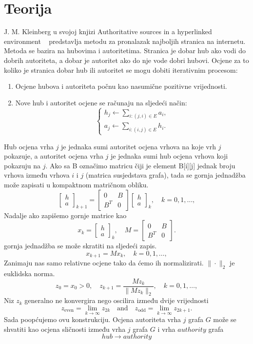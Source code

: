 \documentclass[12pt, letterpaper]{article}
\numberwithin{figure}{section}
\begin{document}
\section{Teorija}
 J. M. Kleinberg u svojoj knjizi Authoritative sources in a hyperlinked environment ~\cite{kleinberg1999} predstavlja metodu za pronalazak najboljih stranica na internetu. Metoda se bazira na hubovima i autoritetima. Stranica je dobar hub ako vodi do dobrih autoriteta, a dobar je autoritet ako do nje vode dobri hubovi. Ocjene za to koliko je stranica dobar hub ili autoritet se mogu dobiti iterativnim procesom:
 \begin{enumerate}
  \item Ocjene hubova i autoriteta počnu kao nasumične pozitivne vrijednosti.
  \item Nove hub i autoritet ocjene se računaju na sljedeći način:
  \[
\begin{cases}
h_j \leftarrow \sum_{i:(j,i)\in E} a_i, \\
a_j \leftarrow \sum_{i:(i,j)\in E} h_i.
\end{cases}
\]
\end{enumerate}
Hub ocjena vrha $j$ je jednaka sumi autoritet ocjena vrhova na koje vrh $j$ pokazuje, a autoritet ocjena vrha $j$ je jednaka sumi hub ocjena vrhova koji pokazuju na $j$. Ako sa B označimo matricu čiji je element B[i][j] jednak broju vrhova između vrhova $i$ i $j$ (matrica susjedstava grafa), tada se gornja jednadžba može zapisati u kompaktnom matričnom obliku.
\[
\begin{bmatrix}
h \\
a
\end{bmatrix}_{k+1}
=
\begin{bmatrix}
0 & B \\
B^T & 0
\end{bmatrix}
\begin{bmatrix}
h \\
a
\end{bmatrix}_{k},
\quad k = 0, 1, \dots,
\]
Nadalje ako zapišemo gornje matrice kao 
\[
x_k = \begin{bmatrix}
h \\
a
\end{bmatrix}_{k},
\quad
M = \begin{bmatrix}
0 & B \\
B^T & 0
\end{bmatrix}.
\]
gornja jednadžba se može skratiti na sljedeći zapis.
\[
x_{k+1} = M x_k, \quad k = 0, 1, \dots,
\]
Zanimaju nas samo relativne ocjene tako da ćemo ih normalizirati. $\|\cdot\|_2$ je euklidska norma.
\begin{equation}
z_0 = x_0 > 0, \quad z_{k+1} = \frac{M z_k}{\|M z_k\|_2}, \quad k = 0, 1, \dots,
\end{equation}
Niz $z_k$ generalno ne konvergira nego oscilira između dvije vrijednosti
\[
z_{\text{even}} = \lim_{k\to\infty} z_{2k} \quad \text{and} \quad z_{\text{odd}} = \lim_{k\to\infty} z_{2k+1}.
\]
Sada poopćujemo ovu konstrukciju. Ocjena autoriteta vrha $j$ grafa $G$ može se shvatiti kao ocjena sličnosti između vrha $j$ grafa $G$ i vrha $\mathit{authority}$ grafa
\[
\mathit{hub} \longrightarrow \mathit{authority}
\]
\end{document}
